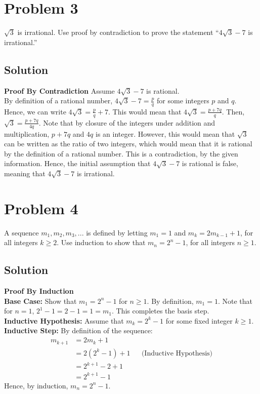 \documentclass[table]{article}
\begin{document}
\section{Problem 3}
$\sqrt{3}$ is irrational. Use proof by contradiction to prove the statement ``$4\sqrt{3} - 7$ is irrational.''
\subsection{Solution}
\textbf{Proof By Contradiction}
Assume $4\sqrt{3} - 7$ is rational.\\
By definition of a rational number, $4\sqrt{3} - 7 = \frac{p}{q}$ for some integers $p$ and $q$. Hence, we can write $4\sqrt{3} = \frac{p}{q} + 7$. This would mean that $4\sqrt{3} = \frac{p+7q}{q}$. Then, $\sqrt{3} = \frac{p+7q}{4q}$. Note that by closure of the integers under addition and multiplication, $p+7q$ and $4q$ is an integer. However, this would mean that $\sqrt{3}$ can be written as the ratio of two integers, which would mean that it is rational by the definition of a rational number. This is a contradiction, by the given information. Hence, the initial assumption that $4\sqrt{3} - 7$ is rational is false, meaning that $4\sqrt{3} - 7$ is irrational.
\section{Problem 4}
A sequence $m_1, m_2, m_3, ...$ is defined by letting $m_1 = 1$ and $m_k = 2m_{k-1} + 1$, for all integers $k \geq 2$. Use induction to show that $m_n = 2^n - 1$, for all integers $n \geq 1$.
\subsection{Solution}
\textbf{Proof By Induction}\\
\textbf{Base Case:} Show that $m_1 = 2^n-1$ for $n \geq 1$. By definition, $m_1 = 1$. Note that for $n=1$, $2^1-1=2-1=1=m_1$. This completes the basis step.\\
\textbf{Inductive Hypothesis:} Assume that $m_k = 2^k-1$ for some fixed integer $k \geq 1$.\\
\textbf{Inductive Step:} By definition of the sequence:
\begin{align*}
m_{k+1}
&= 2m_k+1\\
&= 2(2^k-1)+1 && \text{(Inductive Hypothesis)}\\
&= 2^{k+1} - 2 + 1\\
&= 2^{k+1} - 1
\end{align*}
Hence, by induction, $m_n = 2^n-1$.
\end{document}
